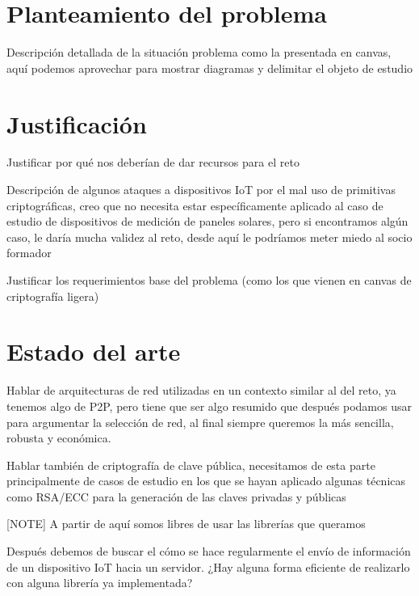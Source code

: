 \documentclass{article}
\begin{document}
    \section{Planteamiento del problema}

        Descripción detallada de la situación problema como la presentada en canvas, aquí podemos aprovechar para mostrar diagramas y delimitar el objeto de estudio

    \section{Justificación}

        Justificar por qué nos deberían de dar recursos para el reto

        Descripción de algunos ataques a dispositivos IoT por el mal uso de primitivas criptográficas, creo que no necesita estar específicamente aplicado al caso de estudio de dispositivos de medición de paneles solares, pero si encontramos algún caso, le daría mucha validez al reto, desde aquí le podríamos meter miedo al socio formador

        Justificar los requerimientos base del problema (como los que vienen en canvas de criptografía ligera)


    \section{Estado del arte}

        Hablar de arquitecturas de red utilizadas en un contexto similar al del reto, ya tenemos algo de P2P, pero tiene que ser algo resumido que después podamos usar para argumentar la selección de red, al final siempre queremos la más sencilla, robusta y económica.

        Hablar también de criptografía de clave pública, necesitamos de esta parte principalmente de casos de estudio en los que se hayan aplicado algunas técnicas como RSA/ECC para la generación de las claves privadas y públicas

        [NOTE] A partir de aquí somos libres de usar las librerías que queramos

        Después debemos de buscar el cómo se hace regularmente el envío de información de un dispositivo IoT hacia un servidor. ¿Hay alguna forma eficiente de realizarlo con alguna librería ya implementada?
\end{document}
